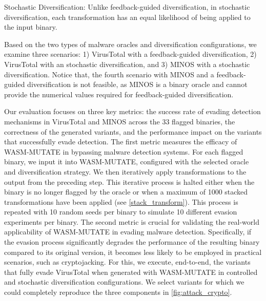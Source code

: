 \begin{definition}{Stochastic Diversification:}
    \label{uncontrolled_def}
    Unlike feedback-guided diversification, in stochastic diversification, each transformation has an equal likelihood of being applied to the input \Wasm binary.
\end{definition}


Based on the two types of malware oracles and diversification configurations, we examine three scenarios:
1) VirusTotal with a feedback-guided diversification, 2) VirusTotal with an stochastic diversification, and 3) MINOS with a stochastic diversification.
Notice that, the fourth scenario with MINOS and a feedback-guided diversification is not feasible, as MINOS is a binary oracle and cannot provide the numerical values required for feedback-guided diversification.

Our evaluation focuses on three key metrics: the success rate of evading detection mechanisms in VirusTotal and MINOS across the 33 flagged binaries, the correctness of the generated variants, and the performance impact on the variants that successfully evade detection.
The first metric measures the efficacy of WASM-MUTATE in bypassing malware detection systems. 
For each flagged binary, we input it into WASM-MUTATE, configured with the selected oracle and diversification strategy. 
We then iteratively apply transformations to the output from the preceding step. 
This iterative process is halted either when the binary is no longer flagged by the oracle or when a maximum of 1000 stacked transformations have been applied (see \autoref{stack_transform}).
This process is repeated with 10 random seeds per binary to simulate 10 different evasion experiments per binary.
The second metric is crucial for validating the real-world applicability of WASM-MUTATE in evading malware detection. 
Specifically, if the evasion process significantly degrades the performance of the resulting binary compared to its original version, it becomes less likely to be employed in practical scenarios, such as cryptojacking.
For this, we execute, end-to-end, the variants that fully evade VirusTotal when generated with WASM-MUTATE in controlled and stochastic diversification configurations.
We select variants for which we could completely reproduce the three components in \autoref{fig:attack_crypto}.


